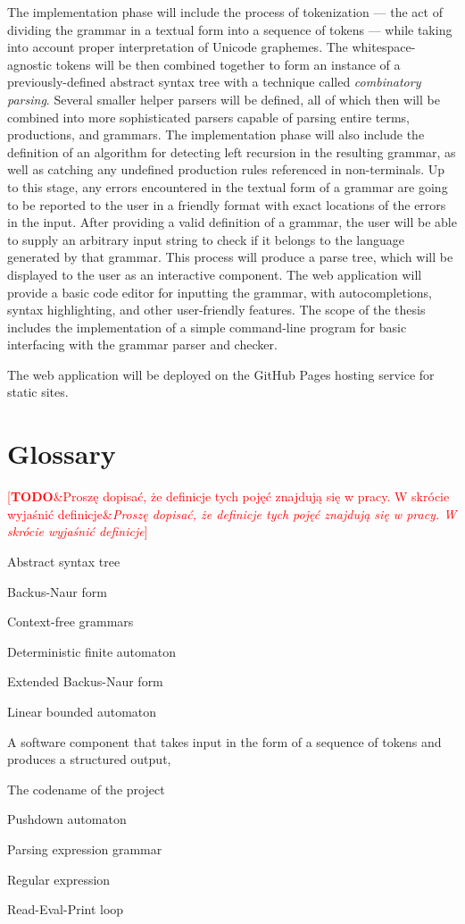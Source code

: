 \documentclass[english,bachelors,forcepolishlogotype]{wizthesis}
\newcommand{\todo}[1]{%
  \textcolor{red}{[\textbf{TODO}\ifx&#1&{}\else{ }\fi\emph{#1}]}%
}
\newcommand{\thisproject}{Parser-parser}
\begin{document}
The implementation phase will include the process of tokenization --- the act of
dividing the grammar in a textual form into a sequence of tokens --- while
taking into account proper interpretation of Unicode graphemes. The
whitespace-agnostic tokens will be then combined together to form an instance of
a previously-defined abstract syntax tree with a technique called
\emph{combinatory parsing}. Several smaller helper parsers will be defined, all
of which then will be combined into more sophisticated parsers capable of
parsing entire terms, productions, and grammars. The implementation phase will
also include the definition of an algorithm for detecting left recursion in the
resulting grammar, as well as catching any undefined production rules referenced
in non-terminals. Up to this stage, any errors encountered in the textual form
of a grammar are going to be reported to the user in a friendly format with
exact locations of the errors in the input. After providing a valid definition
of a grammar, the user will be able to supply an arbitrary input string to check
if it belongs to the language generated by that grammar. This process will
produce a parse tree, which will be displayed to the user as an interactive
component. The web application will provide a basic code editor for inputting
the grammar, with autocompletions, syntax highlighting, and other user-friendly
features. The scope of the thesis includes the implementation of a simple
command-line program for basic interfacing with the grammar parser and checker.

The web application will be deployed on the GitHub Pages hosting service for
static sites.

\newpage

\section{Glossary}

\todo{Proszę dopisać, że definicje tych pojęć znajdują się w pracy. W skrócie
wyjaśnić definicje}

\begin{description}[leftmargin=!,labelwidth=2.5cm]
  \item[AST] Abstract syntax tree
  \item[BNF] Backus-Naur form
  \item[CFG] Context-free grammars
  \item[DFA] Deterministic finite automaton
  \item[EBNF] Extended Backus-Naur form
  \item[LBA] Linear bounded automaton
  \item[Parser] A software component that takes input in the form of a sequence
  of tokens and produces a structured output,
  \item[\thisproject{}] The codename of the project
  \item[PDA] Pushdown automaton
  \item[PEG] Parsing expression grammar
  \item[RE] Regular expression
  \item[REPL] Read-Eval-Print loop
\end{description}
\end{document}
